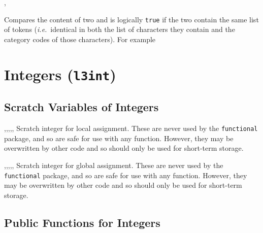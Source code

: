 \documentclass[oneside]{book}
\begin{document}
\begin{function}{\TlIfEq,\TlIfEqTF}
\begin{syntax}
  
    
\end{syntax}
Compares the content of two  and
is logically \texttt{true} if the two contain the same list of
tokens (\emph{i.e.}~identical in both the list of characters they
contain and the category codes of those characters). For example
\begin{demo}
\TlSet{}
\TlSet{}
\TlSet{}
\TlIfEqTF\lTmpaTl{}
\TlIfEqTF\lTmpaTl{}
\end{demo}
\end{function}

\chapter{Integers (\texttt{l3int})}

\section{Scratch Variables of Integers}

\begin{variable}{\lTmpaInt,\lTmpbInt,\lTmpcInt,\lTmpiInt,\lTmpjInt,\lTmpkInt}
Scratch integer for local assignment. These are never used by
the \verb!functional! package, and so are safe for use with any
function. However, they may be overwritten by other
code and so should only be used for short-term storage.
\end{variable}

\begin{variable}{\gTmpaInt,\gTmpbInt,\gTmpcInt,\gTmpiInt,\gTmpjInt,\gTmpkInt}
Scratch integer for global assignment. These are never used by
the \verb!functional! package, and so are safe for use with any
function. However, they may be overwritten by other
code and so should only be used for short-term storage.
\end{variable}

\section{Public Functions for Integers}
\end{document}
